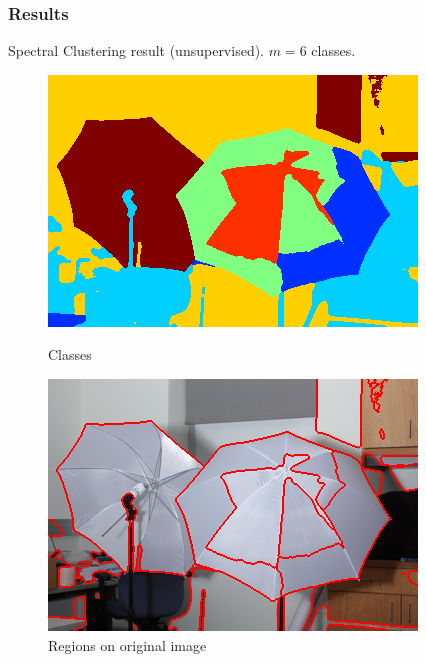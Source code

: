 \documentclass{beamer}
\begin{document}
\begin{frame}
  \frametitle{Results}
  Spectral Clustering result (unsupervised). $m = 6$ classes.
  \begin{figure}[ht]
    \begin{minipage}[b]{0.45\linewidth}
      \centering
      \includegraphics[width=\textwidth]{./Images/Umbrella/classification.png}
      \caption{Classes}
    \end{minipage}
    \begin{minipage}[b]{0.45\linewidth}
      \centering
      \includegraphics[width=\textwidth]{./Images/Umbrella/imWithBorders.png}
      \caption{Regions on original image}
    \end{minipage}
  \end{figure}
\end{frame}
\end{document}
